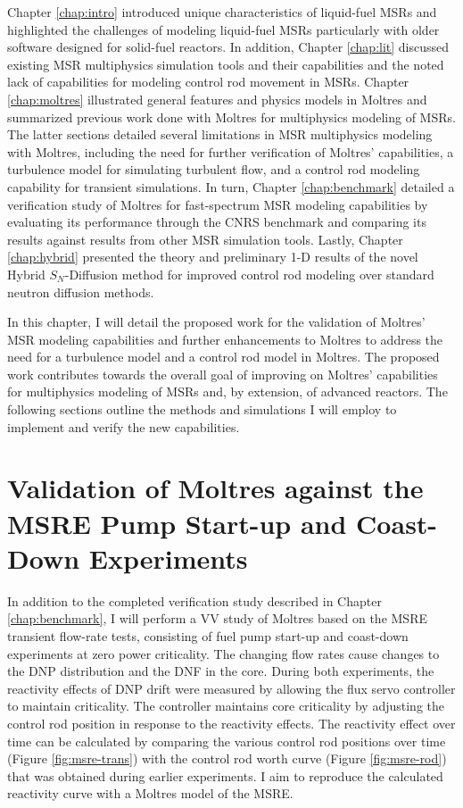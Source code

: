 Chapter \ref{chap:intro} introduced unique characteristics of liquid-fuel
\glspl{MSR}
and highlighted the challenges of modeling liquid-fuel \glspl{MSR} particularly
with older software designed for solid-fuel reactors. In addition, Chapter
\ref{chap:lit} discussed existing \gls{MSR} multiphysics simulation tools and
their capabilities and the noted lack of capabilities for modeling control rod
movement in \glspl{MSR}. Chapter \ref{chap:moltres} illustrated general
features and physics models in Moltres and summarized previous work done with
Moltres for multiphysics modeling of \glspl{MSR}. The latter sections detailed
several limitations in \gls{MSR} multiphysics modeling with
Moltres, including the need for further verification of
Moltres' capabilities, a turbulence model for simulating turbulent flow, and a
control rod modeling capability for transient simulations. In turn,
Chapter \ref{chap:benchmark} detailed a verification study of Moltres for fast-spectrum
\gls{MSR} modeling capabilities by evaluating its performance
through the CNRS benchmark and comparing its results against results from other
\gls{MSR} simulation tools. Lastly, Chapter \ref{chap:hybrid} presented the theory and preliminary
1-D results of the novel Hybrid $S_N$-Diffusion method for improved control rod modeling over
standard neutron diffusion methods.

In this chapter, I will detail the proposed work for the validation of Moltres' \gls{MSR}
modeling capabilities and further enhancements to Moltres to address the
need for a turbulence model and a control rod model in Moltres. The
proposed work contributes towards the overall goal of improving on Moltres' capabilities for
multiphysics modeling of \glspl{MSR} and, by extension, of advanced reactors.
The following sections outline the methods and simulations I will
employ to implement and verify the new capabilities.

\section{Validation of Moltres against the MSRE Pump Start-up and Coast-Down Experiments}

In addition to the completed verification study described in Chapter \ref{chap:benchmark}, I will
perform a \gls{VV} study of Moltres based on the \gls{MSRE} transient flow-rate tests, consisting
of fuel pump start-up and coast-down experiments at zero power criticality. The changing flow rates
cause changes to the \gls{DNP} distribution and the \gls{DNF} in the core. During both
experiments, the reactivity effects of \gls{DNP} drift were measured by
allowing the flux servo controller to maintain criticality. The controller maintains core
criticality by adjusting the control rod position in response to the reactivity effects. The
reactivity effect over time can be calculated by comparing the various control rod positions over
time (Figure \ref{fig:msre-trans}) with the control rod worth curve (Figure \ref{fig:msre-rod})
that was obtained during earlier experiments. I aim to
reproduce the calculated reactivity curve with a Moltres model of the \gls{MSRE}.

